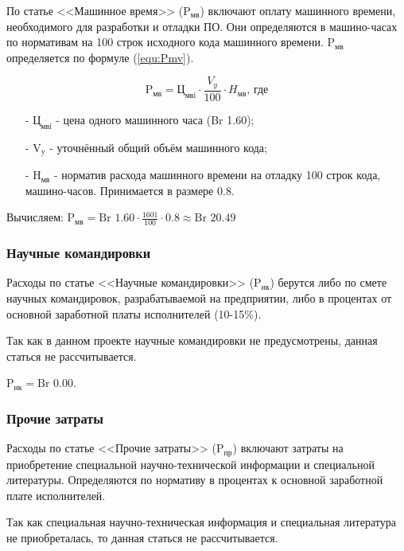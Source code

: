 По статье <<Машинное время>> ($\text{P}_\text{мв}$) включают оплату машинного времени, необходимого для разработки и отладки ПО.
Они определяются в машино-часах по нормативам на 100 строк исходного кода машинного времени.
$\text{P}_\text{мв}$ определяется по формуле (\ref{equ:Pmv}).

\begin{equation}
    \label{equ:Pmv}
    \text{P}_\text{мв} = \text{Ц}_\text{мвi} \cdot \frac{ V_y }{ 100 } \cdot H_\text{мв} \text{, где}
\end{equation}

\begin{enumerate}
    \item[-] $\text{Ц}_\text{мвi}$ - цена одного машинного часа (Br 1.60); 
    \item[-] $\text{V}_\text{y}$ - уточнённый общий объём машинного кода;
    \item[-] $\text{H}_\text{мв}$ - норматив расхода машинного времени на отладку 100 строк кода, машино-часов. Принимается в размере 0.8.
\end{enumerate}

Вычисляем: $\text{P}_\text{мв} = \text{Br } 1.60 \cdot \frac{ 1601 }{ 100 } \cdot 0.8 \approx \text{Br }20.49$

\subsubsection*{Научные командировки}

Расходы по статье <<Научные командировки>> ($\text{P}_\text{нк}$) берутся либо по смете научных командировок,
разрабатываемой на предприятии, либо в процентах от основной заработной платы исполнителей (10-15\%).

Так как в данном проекте научные командировки не предусмотрены, данная статься не рассчитывается. 

$\text{P}_\text{нк} = \text{Br }0.00$.

\subsubsection*{Прочие затраты}

Расходы по статье <<Прочие затраты>> ($\text{P}_\text{пр}$) включают затраты на приобретение специальной научно-технической информации и специальной литературы.
Определяются по нормативу в процентах к основной заработной плате исполнителей.

Так как специальная научно-техническая информация и специальная литература не приобреталась, то данная статься не рассчитывается.

